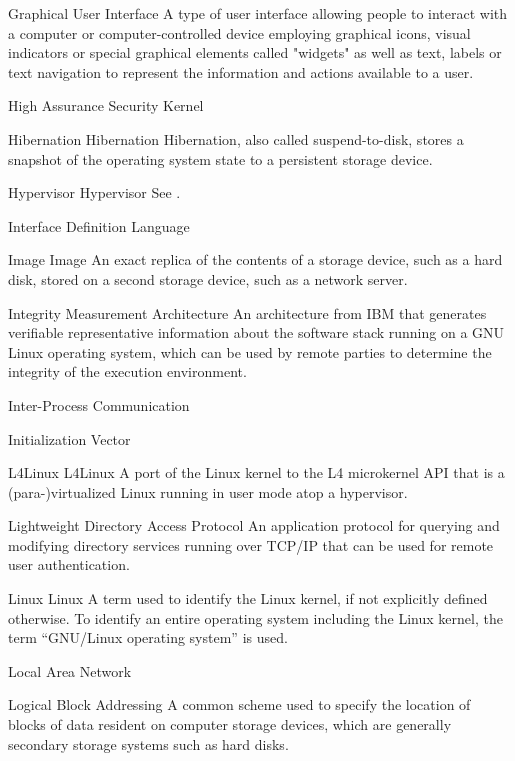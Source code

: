     {Graphical User Interface}
    {A type of user interface allowing people to interact with a computer or
computer-controlled device employing graphical icons, visual indicators or
special graphical elements called "widgets" as well as text, labels or text
navigation to represent the information and actions available to a user.}

    {High Assurance Security Kernel}

\glosentry
    {Hibernation}
    {Hibernation}
    {Hibernation, also called suspend-to-disk, stores a snapshot of the
     operating system state to a persistent storage device.}

\glosentry
    {Hypervisor}
    {Hypervisor}
    {See \VirtualMachineMonitor.}

    {Interface Definition Language}

\glosentry
    {Image}
    {Image}
    {An exact replica of the contents of a storage device, such as a hard disk,
stored on a second storage device, such as a network server.}

    {Integrity Measurement Architecture}
    {An architecture from IBM that generates verifiable representative
information about the software stack running on a GNU Linux operating system, which can be
used by remote parties to determine the integrity of the execution environment.}

    {Inter-Process Communication}

    {Initialization Vector}

\glosentry
    {L4Linux}
    {L4Linux}
    {A port of the Linux kernel to the L4 microkernel API that is a
(para-)virtualized Linux running in user mode atop a hypervisor.}

    {Lightweight Directory Access Protocol}
    {An application protocol for querying and modifying directory services
running over TCP/IP that can be used for remote user authentication.}

\glosentry
    {Linux}
    {Linux}
    {A term used to identify the Linux kernel, if not explicitly defined
otherwise. To identify an entire operating system including the Linux kernel,
the term ``GNU/Linux operating system'' is used.}

    {Local Area Network}

    {Logical Block Addressing}
    {A common scheme used to specify the location of blocks of data resident on
computer storage devices, which are generally secondary storage systems such as
hard disks.}


